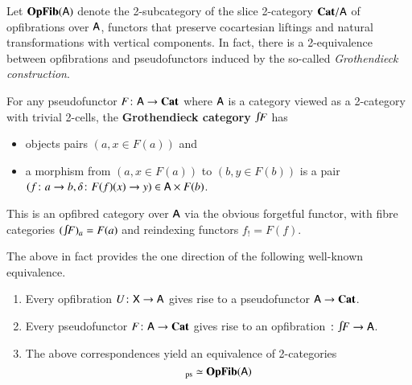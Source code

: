 \documentclass[reqno]{amsart}
\begin{document}
Let $\mathbf{OpFib}(\mathsf{A})$ denote the 2-subcategory of the slice 2-category $\mathbf{Cat}/ \mathsf{A}$ of opfibrations over $\mathsf{A}$, functors that preserve cocartesian liftings and natural transformations with vertical components. In fact, there is a 2-equivalence between opfibrations and pseudofunctors induced by the so-called \emph{Grothendieck construction}. 
\begin{defn}\label{def:GrothCat}
For any pseudofunctor $F\colon\mathsf{A}\to\mathbf{Cat}$ where $\mathsf{A}$ is a category viewed as a 2-category with trivial 2-cells, the \textbf{Grothendieck category}
$\inta F$ has
\begin{itemize}
\item objects pairs $(a, x \in F(a))$ and
\item a morphism from $(a, x \in F(a))$ to $(b, y\in F(b))$ is a pair $(f \colon a \to b,\delta \colon F(f)(x) \to y)\in\mathsf{A}\times F(b)$.
\end{itemize}
This is an opfibred category over $\mathsf{A}$ via the obvious forgetful functor, with fibre categories $(\inta F)_a=F(a)$ and reindexing functors $f_!=F(f)$.
\end{defn}
The above in fact provides the one direction of the following well-known equivalence.

\begin{thm}\label{thm:Grothendieck}\hfill
    \begin{enumerate}
        \item Every opfibration $U \colon \mathsf{X} \to \mathsf{A}$ gives rise to a pseudofunctor $\mathsf{A} \to \mathbf{Cat}$.
        \item Every pseudofunctor $F \colon \mathsf{A} \to \mathbf{Cat}$ gives rise to  an opfibration $\maps \inta F\to\A$.
        \item The above correspondences yield an equivalence of 2-categories 
        \begin{displaymath}
            [\A,\bicat{Cat}]_\pse \simeq \OpFib(\A)
        \end{displaymath}
    \end{enumerate}
\end{thm}
\end{document}
